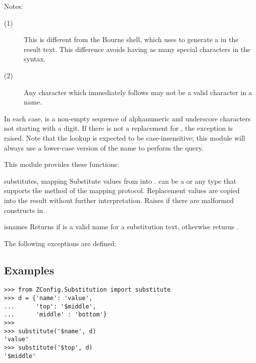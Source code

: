 \documentclass{howto}
\begin{document}
\noindent
Notes:
\begin{description}
  \item[(1)]  This is different from the Bourne shell, which uses
              \code{\textbackslash\$} to generate a \character{\$} in
              the result text.  This difference avoids having as many
              special characters in the syntax.

  \item[(2)]  Any character which immediately follows  may
              not be a valid character in a name.
\end{description}

In each case,  is a non-empty sequence of alphanumeric and
underscore characters not starting with a digit.  If there is not a
replacement for , the exception
 is raised.
Note that the lookup is expected to be case-insensitive; this module
will always use a lower-case version of the name to perform the query.

This module provides these functions:

\begin{funcdesc}{substitute}{s, mapping}
  Substitute values from  into .  
  can be a  or any type that supports the 
  method of the mapping protocol.  Replacement
  values are copied into the result without further interpretation.
  Raises  if there are malformed
  constructs in .
\end{funcdesc}

\begin{funcdesc}{isname}{s}
  Returns  if  is a valid name for a substitution
  text, otherwise returns .
\end{funcdesc}

The following exceptions are defined:


\subsection{Examples}

\begin{verbatim}
>>> from ZConfig.Substitution import substitute
>>> d = {'name': 'value',
...      'top': '$middle',
...      'middle' : 'bottom'}
>>>
>>> substitute('$name', d)
'value'
>>> substitute('$top', d)
'$middle'
\end{verbatim}
\end{document}
